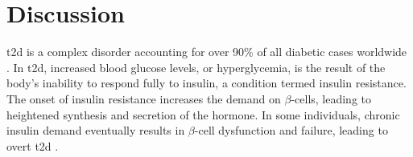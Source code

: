 
\chapter{Discussion}  %
\label{chp:discussion}
\clearpage

\newpage\null\thispagestyle{empty}\newpage



\par \acrfull{t2d} is a complex disorder accounting for over 90\% of all diabetic cases worldwide \textbf{\cite{home_idf_nodate}}. In \gls{t2d}, increased blood glucose levels, or hyperglycemia, is the result of the body's inability to respond fully to insulin, a condition termed insulin resistance. The onset of insulin resistance increases the demand on $\beta$-cells, leading to heightened synthesis and secretion of the hormone. In some individuals, chronic insulin demand eventually results in $\beta$-cell dysfunction and failure, leading to overt \gls{t2d} \textbf{\cite{banday_pathophysiology_2020}}.\\

